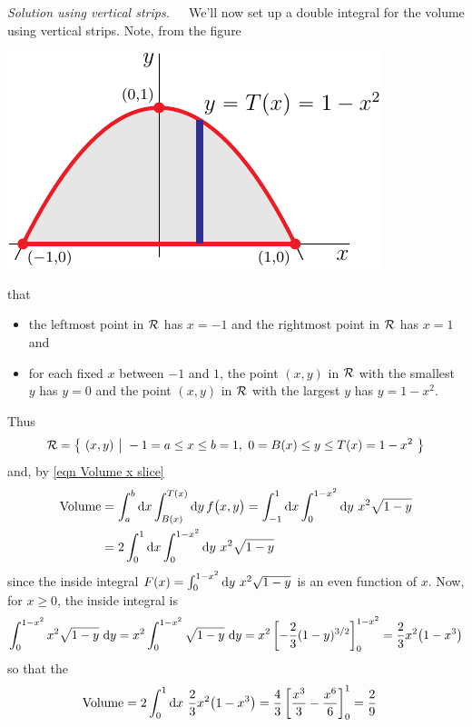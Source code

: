 \begin{eg}[Volume]
\medskip\noindent\emph{Solution using vertical strips.}\ \ \
We'll now set up a double integral for the volume using vertical strips.  
Note, from the figure 
\begin{efig}
\begin{center}
   \includegraphics{dblIntV0b.pdf}
\end{center}
\end{efig}
that
\begin{itemize}
\item
the leftmost point in $\mathcal{R}$ has $x=-1$ and the rightmost point
in $\mathcal{R}$ has $x=1$ and
\item 
for each fixed $x$ between $-1$ and $1$, the point $(x,y)$ in $\mathcal{R}$
with the smallest $y$ has $y=0$ and the point $(x,y)$ in $\mathcal{R}$
with the largest $y$ has $y=1-x^2$.
\end{itemize}
Thus
\begin{equation*}
\cR=\Set{(x,y)}{-1=a\le x\le b=1,\ 
        0= B(x)\le y\le T(x) = 1-x^2}
\end{equation*}
and, by \eqref{eqn Volume x slice}
\begin{align*}
\text{Volume} &= \int_a^b \mathrm{d}x \int_{B(x)}^{T(x)} \mathrm{d}y\, f\big(x,y\big) 
        = \int_{-1}^1 \mathrm{d}x \int_0^{1-x^2} \mathrm{d}y\  x^2\sqrt{1-y}  \\
&=2\int_0^1 \mathrm{d}x \int_0^{1-x^2} \mathrm{d}y\  x^2\sqrt{1-y}
\end{align*}
since the inside integral $F(x) =  \int_0^{1-x^2} \mathrm{d}y\  x^2\sqrt{1-y}$
is an even function of $x$.
Now, for $x\ge 0$, the inside integral is
\begin{align*}
\int_0^{1-x^2}  x^2\sqrt{1-y} \ \mathrm{d}y
= x^2 \int_0^{1-x^2}  \sqrt{1-y} \ \mathrm{d}y
=x^2 \left[ -\frac{2}{3}(1-y)^{3/2} \right]_0^{1-x^2}
=\frac{2}{3}x^2\big(1-x^3\big) 
\end{align*}
so that the
\begin{align*}
\text{Volume} &= 2\int_0^1 \mathrm{d}x\ \frac{2}{3}x^2\big(1-x^3\big)
=\frac{4}{3}\left[\frac{x^3}{3}-\frac{x^6}{6}\right]_0^1
=\frac{2}{9}
\end{align*} 



\end{eg}
